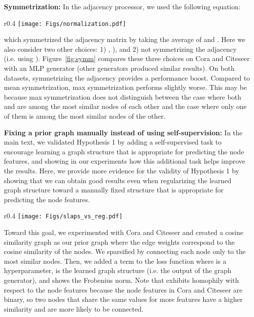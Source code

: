 \documentclass{article}
\begin{document}
\textbf{Symmetrization:} In the adjacency processor, we used the following equation:

\begin{wrapfigure}{r}{0.4\columnwidth}
   \texttt{[image: Figs/normalization.pdf]}
   \caption{\label{fig:symm} The performance of SLAPS on Cora and Citeseer with different adjacency symmetrizations.
   }
\end{wrapfigure}
which symmetrized the adjacency matrix by taking the average of  and . Here we also consider two other choices: 1) , ), and 2) not symmetrizing the adjacency (i.e. using ).
Figure~\ref{fig:symm} compares these three choices on Cora and Citeseer with an MLP generator (other generators produced similar results). On both datasets, symmetrizing the adjacency provides a performance boost. 
Compared to mean symmetrization, max symmetrization performs slightly worse. This may be because max symmetrization does not distinguish between the case where both  and  are among the  most similar nodes of each other and the case where only one of them is among the  most similar nodes of the other.

\textbf{Fixing a prior graph manually instead of using self-supervision:} In the main text, we validated Hypothesis 1 by adding a self-supervised task to encourage learning a graph structure that is appropriate for predicting the node features, and showing in our experiments how this additional task helps improve the results. Here, we provide more evidence for the validity of Hypothesis 1 by showing that we can obtain good results even when regularizing the learned graph structure toward a manually fixed structure that is appropriate for predicting the node features. 
\begin{wrapfigure}{r}{0.4\columnwidth}
   \texttt{[image: Figs/slaps\_vs\_reg.pdf]}
   \caption{\label{fig:slaps-vs-reg} The performance of SLAPS and regularization toward a manually defined prior structure on Cora and Citeseer when using the MLP generator.
   }
\end{wrapfigure}

Toward this goal, we experimented with Cora and Citeseer and created a cosine similarity graph as our prior graph  where the edge weights correspond to the cosine similarity of the nodes. We sparsified  by connecting each node only to the  most similar nodes. Then, we added a term  to the loss function where  is a hyperparameter,  is the learned graph structure (i.e. the output of the graph generator), and  shows the Frobenius norm. Note that  exhibits homophily with respect to the node features because the node features in Cora and Citeseer are binary, so two nodes that share the same values for more features have a higher similarity and are more likely to be connected.
\end{document}
